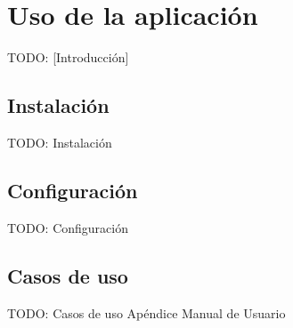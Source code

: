\chapter{Uso de la aplicación\label{cap:uso_de_la_aplicacion}}

TODO: [Introducción]


\section{Instalación\label{sec:uso:instalacion}}

TODO: Instalación


\section{Configuración\label{sec:uso:configuracion}}

TODO: Configuración


\section{Casos de uso\label{sec:uso:casos_de_uso}}

TODO: Casos de uso
  {Apéndice Manual de Usuario}